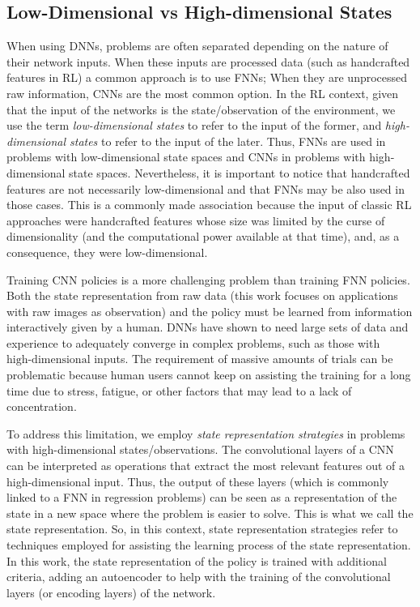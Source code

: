 \subsection{Low-Dimensional vs High-dimensional States}
When using DNNs, problems are often separated depending on the nature of their network inputs. When these inputs are processed data (such as handcrafted features in RL) a common approach is to use FNNs; When they are unprocessed raw information, CNNs are the most common option. In the RL context, given that the input of the networks is the state/observation of the environment, we use the term \emph{low-dimensional states} to refer to the input of the former, and \emph{high-dimensional states} to refer to the input of the later. Thus, FNNs are used in problems with low-dimensional state spaces and CNNs in problems with high-dimensional state spaces. Nevertheless, it is important to notice that handcrafted features are not necessarily low-dimensional and that FNNs may be also used in those cases. This is a commonly made association because the input of classic RL approaches were handcrafted features whose size was limited by the curse of dimensionality (and the computational power available at that time), and, as a consequence, they were low-dimensional.

Training CNN policies is a more challenging problem than training FNN policies. Both the state representation from raw data (this work focuses on applications with raw images as observation) and the policy must be learned from information interactively given by a human. DNNs have shown to need large sets of data and experience to adequately converge in complex problems, such as those with $\text{high-dimensional}$ inputs. The requirement of massive amounts of trials can be problematic because human users cannot keep on assisting the training for a long time due to stress, fatigue, or other factors that may lead to a lack of concentration.

To address this limitation, we employ \emph{state representation strategies} in problems with high-dimensional states/observations. The convolutional layers of a CNN can be interpreted as operations that extract the most relevant features out of a high-dimensional input. Thus, the output of these layers (which is commonly linked to a FNN in regression problems) can be seen as a representation of the state in a new space where the problem is easier to solve. This is what we call the state representation. So, in this context, state representation strategies refer to techniques employed for assisting the learning process of the state representation. In this work, the state representation of the policy is trained with additional criteria, adding an autoencoder to help with the training of the convolutional layers (or encoding layers) of the network.

